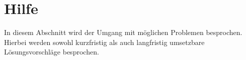 \section{Hilfe}

\noindent
In diesem Abschnitt wird der Umgang mit möglichen Problemen besprochen. Hierbei werden sowohl kurzfristig als auch langfristig umsetzbare Lösungsvorschläge besprochen.
